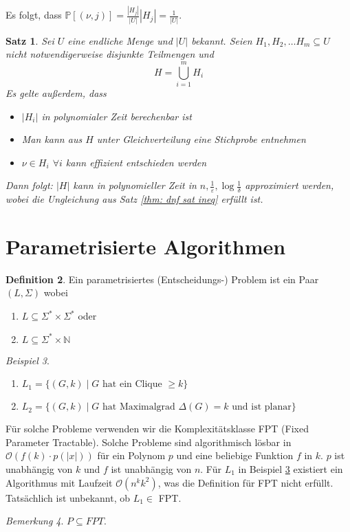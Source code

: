\documentclass[a4paper, 12pt]{article}
\theoremstyle{plain}
\newtheorem{theorem}{Satz}[section] %
\theoremstyle{definition}
\newtheorem{definition}[theorem]{Definition} %
\theoremstyle{lemma}
\theoremstyle{remark}
\newtheorem{remark}[theorem]{Bemerkung}
\theoremstyle{corollary}
\theoremstyle{example}
\newtheorem{example}[theorem]{Beispiel}
\begin{document}
	Es folgt, dass $\mathbb{P}[(\nu,j)] = \frac{\left|H_j\right|}{\left|U\right|} \left|H_j\right| = \frac{1}{\left|U\right|}$.
	\begin{theorem}
		Sei $U$ eine endliche Menge und $\left|U\right|$ bekannt. Seien $H_1,H_2,\dots H_m \subseteq U$ nicht notwendigerweise disjunkte Teilmengen und \[H = \bigcup_{i=1}^m H_i\] Es gelte außerdem, dass \begin{itemize}
			\item $\left|H_i\right|$ in polynomialer Zeit berechenbar ist
			\item Man kann aus $H$ unter Gleichverteilung eine Stichprobe entnehmen
			\item $\nu \in H_i$ $\forall i$ kann effizient entschieden werden
		\end{itemize}
		Dann folgt: $\left|H\right|$ kann in polynomieller Zeit in $n, \frac{1}{\varepsilon}, \log \frac{1}{\delta}$ approximiert werden, wobei die Ungleichung aus Satz \ref{thm: dnf sat ineq} erfüllt ist.
	\end{theorem}
\section{Parametrisierte Algorithmen}
	\begin{definition}
		Ein parametrisiertes (Entscheidungs-) Problem ist ein Paar $(L,\Sigma)$ wobei \begin{enumerate}
			\item $L \subseteq \Sigma^* \times \Sigma^*$ oder
			\item $L \subseteq \Sigma^* \times \mathbb{N}$
		\end{enumerate}
	\end{definition}
	\begin{example}
		\label{bsp: FPT}
		\begin{enumerate}
			\item $L_1 = \{(G, k) \mid G \text{ hat ein Clique } \geq k\}$
			\item $L_2 = \{(G,k) \mid G \text{ hat Maximalgrad } \Delta(G) = k \text{ und ist planar}\}$
		\end{enumerate}
	\end{example}
	Für solche Probleme verwenden wir die Komplexitätsklasse FPT (Fixed Parameter Tractable). Solche Probleme sind algorithmisch lösbar in $\mathcal{O}(f(k)\cdot p(\left|x\right|))$ für ein Polynom $p$ und eine beliebige Funktion $f$ in $k$. $p$ ist unabhängig von $k$ und $f$ ist unabhängig von $n$. Für $L_1$ in Beispiel \ref{bsp: FPT} existiert ein Algorithmus mit Laufzeit $\mathcal{O}(n^kk^2)$, was die Definition für FPT nicht erfüllt. Tatsächlich ist unbekannt, ob $L_1\in$ FPT.
	\begin{remark}
		$P \subseteq FPT$.
	\end{remark}
\end{document}
